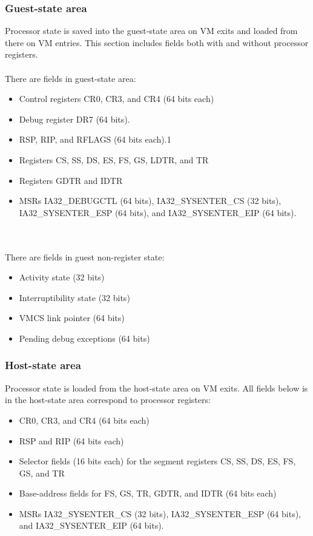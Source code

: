\documentclass[onecolumn, draftclsnofoot,10pt, compsoc]{IEEEtran}
\begin{document}
	\subsubsection{Guest-state area}
    Processor state is saved into the guest-state area on VM exits and loaded from there on VM entries. This section includes fields both with and without processor registers.
    \ \\ \ \\
	There are fields in guest-state area:
	\begin{itemize}
	\item Control registers CR0, CR3, and CR4 (64 bits each)
	\item Debug register DR7 (64 bits).
	\item RSP, RIP, and RFLAGS (64 bits each).1
	\item Registers CS, SS, DS, ES, FS, GS, LDTR, and TR
	\item Registers GDTR and IDTR
	\item MSRs IA32\_DEBUGCTL (64 bits), IA32\_SYSENTER\_CS (32 bits),
IA32\_SYSENTER\_ESP (64 bits), and IA32\_SYSENTER\_EIP (64 bits).
	\end{itemize}
    \ \\ \ \\
	There are fields in guest non-register state:
	\begin{itemize}
	\item Activity state (32 bits)
	\item Interruptibility state (32 bits)
	\item VMCS link pointer (64 bits)
	\item Pending debug exceptions (64 bits)
	\end{itemize}
	\subsubsection{Host-state area}
    Processor state is loaded from the host-state area on VM exits. All fields below is in the host-state area correspond to processor registers:
    \begin{itemize}
	\item CR0, CR3, and CR4 (64 bits each)
	\item RSP and RIP (64 bits each)
	\item Selector fields (16 bits each) for the segment registers CS, SS, DS, ES, FS, GS, and TR
	\item Base-address fields for FS, GS, TR, GDTR, and IDTR (64 bits each)
    \item MSRs IA32\_SYSENTER\_CS (32 bits), IA32\_SYSENTER\_ESP (64 bits), and IA32\_SYSENTER\_EIP (64 bits).
	\end{itemize}
\end{document}
